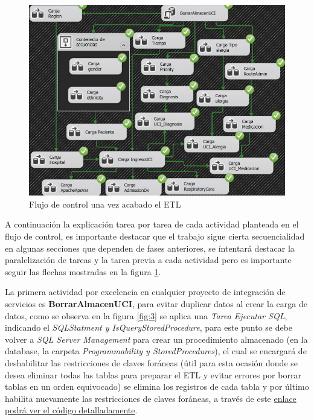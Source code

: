 \documentclass[12pt, a4paper, twoside]{article}
\begin{document}
	
	\begin{figure}[h!]
		\centering
		\includegraphics[width=1\textwidth]{image/100_ETL_ejecutandose.png}
		\caption{Flujo de control una vez acabado el ETL}
		\label{fig:2}
	\end{figure}
	
	A continuación la explicación tarea por tarea de cada actividad planteada en el flujo de control, es importante destacar que el trabajo sigue cierta secuencialidad en algunas secciones que dependen de fases anteriores, se íntentará destacar la paralelización de tareas y la tarea previa a cada actividad pero es importante seguir las flechas mostradas en la figura \ref{fig:2}. 
	
	La primera actividad por excelencia en cualquier proyecto de integración de servicios es \textbf{BorrarAlmacenUCI}, para evitar duplicar datos al crear la carga de datos, como se observa en la figura \ref{fig:3} se aplica una \textit{Tarea Ejecutar SQL}, indicando el \textit{SQLStatment y IsQueryStoredProcedure}, para este punto se debe volver a \textit{SQL Server Management} para crear un procedimiento almacenado (en la database, la carpeta \textit{Programmability y StoredProcedures}), el cual se encargará de deshabilitar las restricciones de claves foráneas (útil para esta ocasión donde se desea eliminar todas las tablas para preparar el ETL y evitar errores por borrar tablas en un orden equivocado) se elimina los registros de cada tabla y por último habilita nuevamente las restricciones de claves foráneas, a través de este \href{https://github.com/Diegodepab/almacen_UCI_Sanitaria/blob/main/ETL/BorrarAlmacenUCI.sql}{enlace podrá ver el código detalladamente}.
\end{document}
